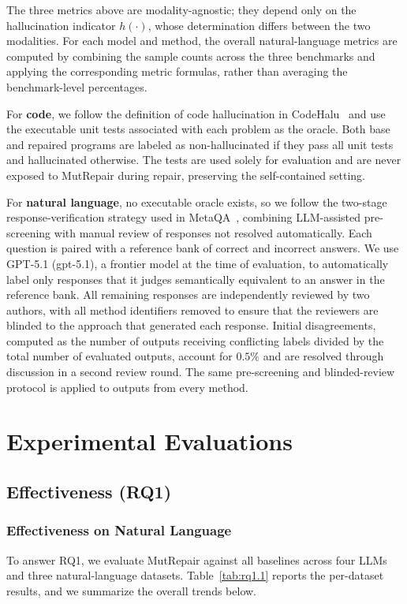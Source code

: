 \documentclass[acmsmall,screen,review,anonymous]{acmart}
\begin{document}
The three metrics above are modality-agnostic; they depend only on the hallucination indicator $h(\cdot)$, whose determination differs between the two modalities. For each model and method, the overall natural-language metrics are computed by combining the sample counts across the three benchmarks and applying the corresponding metric formulas, rather than averaging the benchmark-level percentages.

For \textbf{code}, we follow the definition of code hallucination in CodeHalu~\cite{tian2025codehalu} and use the executable unit tests associated with each problem as the oracle. Both base and repaired programs are labeled as non-hallucinated if they pass all unit tests and hallucinated otherwise. The tests are used solely for evaluation and are never exposed to MutRepair during repair, preserving the self-contained setting.

For \textbf{natural language}, no executable oracle exists, so we follow the two-stage response-verification strategy used in MetaQA~\cite{yang2025hallucination}, combining LLM-assisted pre-screening with manual review of responses not resolved automatically. Each question is paired with a reference bank of correct and incorrect answers. We use GPT-5.1 (gpt-5.1), a frontier model at the time of evaluation, to automatically label only responses that it judges semantically equivalent to an answer in the reference bank. All remaining responses are independently reviewed by two authors, with all method identifiers removed to ensure that the reviewers are blinded to the approach that generated each response. Initial disagreements, computed as the number of outputs receiving conflicting labels divided by the total number of evaluated outputs, account for $0.5\%$ and are resolved through discussion in a second review round. The same pre-screening and blinded-review protocol is applied to outputs from every method.


\section{Experimental Evaluations}
\subsection{Effectiveness (RQ1)}
\subsubsection{Effectiveness on Natural Language}
To answer RQ1, we evaluate MutRepair against all baselines across four LLMs and three natural-language datasets. Table~\ref{tab:rq1.1} reports the per-dataset results, and we summarize the overall trends below.
\end{document}
